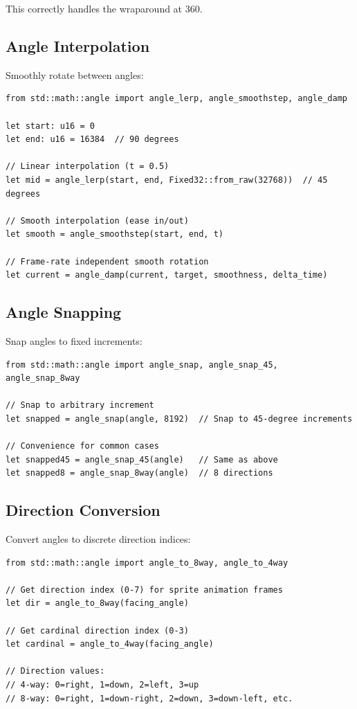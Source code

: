 This correctly handles the wraparound at 360\textdegree.

\subsection{Angle Interpolation}

Smoothly rotate between angles:

\begin{lstlisting}
from std::math::angle import angle_lerp, angle_smoothstep, angle_damp

let start: u16 = 0
let end: u16 = 16384  // 90 degrees

// Linear interpolation (t = 0.5)
let mid = angle_lerp(start, end, Fixed32::from_raw(32768))  // 45 degrees

// Smooth interpolation (ease in/out)
let smooth = angle_smoothstep(start, end, t)

// Frame-rate independent smooth rotation
let current = angle_damp(current, target, smoothness, delta_time)
\end{lstlisting}

\subsection{Angle Snapping}

Snap angles to fixed increments:

\begin{lstlisting}
from std::math::angle import angle_snap, angle_snap_45, angle_snap_8way

// Snap to arbitrary increment
let snapped = angle_snap(angle, 8192)  // Snap to 45-degree increments

// Convenience for common cases
let snapped45 = angle_snap_45(angle)   // Same as above
let snapped8 = angle_snap_8way(angle)  // 8 directions
\end{lstlisting}

\subsection{Direction Conversion}

Convert angles to discrete direction indices:

\begin{lstlisting}
from std::math::angle import angle_to_8way, angle_to_4way

// Get direction index (0-7) for sprite animation frames
let dir = angle_to_8way(facing_angle)

// Get cardinal direction index (0-3)
let cardinal = angle_to_4way(facing_angle)

// Direction values:
// 4-way: 0=right, 1=down, 2=left, 3=up
// 8-way: 0=right, 1=down-right, 2=down, 3=down-left, etc.
\end{lstlisting}

